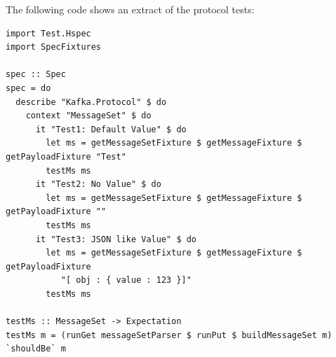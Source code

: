The following code shows an extract of the protocol tests:
\begin{lstlisting}
import Test.Hspec
import SpecFixtures

spec :: Spec
spec = do
  describe "Kafka.Protocol" $ do
    context "MessageSet" $ do
      it "Test1: Default Value" $ do
        let ms = getMessageSetFixture $ getMessageFixture $ getPayloadFixture "Test"
        testMs ms
      it "Test2: No Value" $ do
        let ms = getMessageSetFixture $ getMessageFixture $ getPayloadFixture ""
        testMs ms
      it "Test3: JSON like Value" $ do
        let ms = getMessageSetFixture $ getMessageFixture $ getPayloadFixture
           "[ obj : { value : 123 }]"
        testMs ms

testMs :: MessageSet -> Expectation
testMs m = (runGet messageSetParser $ runPut $ buildMessageSet m) `shouldBe` m

\end{lstlisting}




